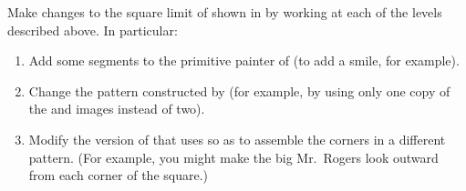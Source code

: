 \begin{exercise}
	\label{Exercise 2.52}
	Make changes to the square limit of  shown in  by working at each of the levels described above.
	In particular:
	\begin{enumerate}[label = \alph*., leftmargin = *]

		\item
			Add some segments to the primitive  painter of  (to add a smile, for example).

		\item
			Change the pattern constructed by  (for example, by using only one copy of the  and  images instead of two).

		\item
			Modify the version of  that uses  so as to assemble the corners in a different pattern.
			(For example, you might make the big Mr.~Rogers look outward from each corner of the square.)

	\end{enumerate}
\end{exercise}
